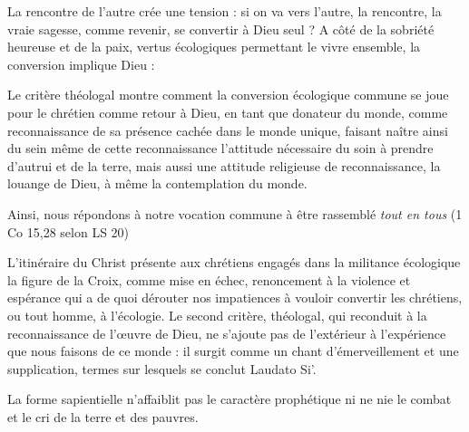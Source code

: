 La rencontre de l'autre crée une tension : si on va vers l'autre, la rencontre, la vraie sagesse, comme revenir, se convertir à Dieu seul ? 
A côté de la sobriété heureuse et de la paix, vertus écologiques permettant le vivre ensemble, la conversion implique Dieu : 
\begin{singlequote}
    Le critère théologal montre comment la conversion écologique commune se joue pour le chrétien comme retour à Dieu, en tant que donateur du monde, comme reconnaissance de sa présence cachée dans le monde unique, faisant naître ainsi du sein même de cette reconnaissance l’attitude nécessaire du soin à prendre d’autrui et de la terre, mais aussi une attitude religieuse de reconnaissance, la louange de Dieu, à même la contemplation du monde. \cite[par. 11]{goujon_laudato_2022}
    \end{singlequote}
Ainsi, nous répondons à notre vocation commune à être rassemblé \textit{tout en tous} (1 Co 15,28 selon LS 20)
    \begin{singlequote}
    
L’itinéraire du Christ présente aux chrétiens engagés dans la militance écologique la figure de la Croix, comme mise en échec, renoncement à la violence et espérance qui a de quoi dérouter nos impatiences à vouloir convertir les chrétiens, ou tout homme, à l’écologie. Le second critère, théologal, qui reconduit à la reconnaissance de l’œuvre de Dieu, ne s’ajoute pas de l’extérieur à l’expérience que nous faisons de ce monde : il surgit comme un chant d’émerveillement et une supplication, termes sur lesquels se conclut Laudato Si’. \cite[par. 12]{goujon_laudato_2022}
    \end{singlequote}
La forme sapientielle n'affaiblit pas le caractère prophétique ni ne nie le combat et le cri de la terre et des pauvres. 
